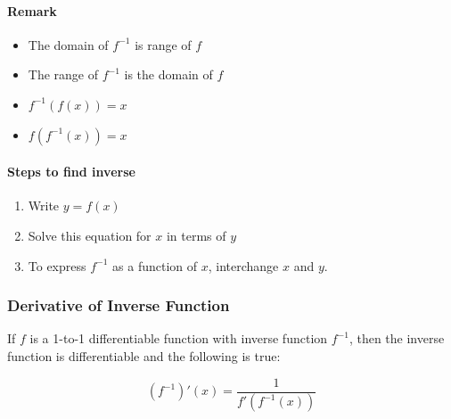 \documentclass[12pt]{article}
\begin{document}
\paragraph{Remark} 
\begin{itemize}
    \item The domain of $f^{-1}$ is range of $f$
    \item The range of $f^{-1}$ is the domain of $f$
    \item $f^{-1}(f(x)) = x$
    \item $f(f^{-1}(x)) = x$
\end{itemize}


\paragraph{Steps to find inverse}
\begin{enumerate}
    \item Write $y=f(x)$
    \item Solve this equation for $x$ in terms of $y$
    \item To express $f^{-1}$ as a function of $x$, interchange $x$ and $y$.
\end{enumerate}

\subsubsection{Derivative of Inverse Function}
If $f$ is a 1-to-1 differentiable function with inverse function $f^{-1}$, then the inverse function is differentiable and the following is true: 

$$(f^{-1})'(x) = \frac{1}{f'(f^{-1}(x))}$$
\end{document}

